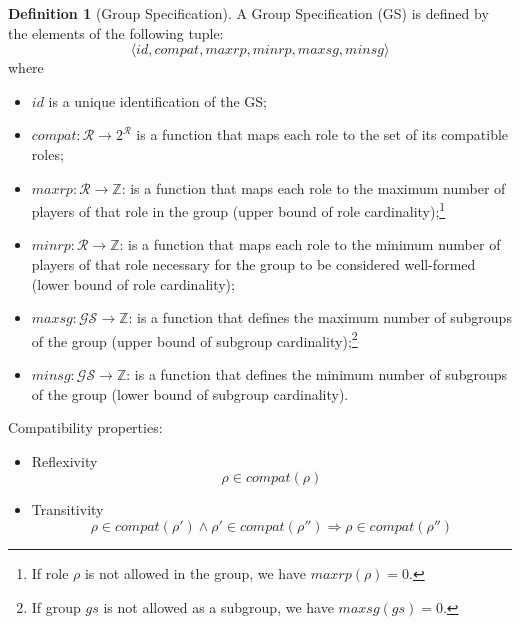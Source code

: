 \documentclass{article}
\newcommand{\set}[1]{\mathcal{#1}}
\theoremstyle{definition} \newtheorem{definition}{Definition}
\begin{document}
\begin{definition}[Group Specification]
  A Group Specification (GS) is defined by the elements of the following tuple:
  \begin{displaymath}
    \langle id, compat, maxrp, minrp, maxsg, minsg \rangle
  \end{displaymath}
  where
  \begin{itemize}
  \item $id$ is a unique identification of the GS;
 \item $compat : \set{R} \to 2^{\mathcal{R}}$ is a
    function that maps each role to the set of its compatible roles;
  \item $maxrp : \mathcal{R} \to \mathbb{Z}$: is a function that maps
    each role to the maximum number of players of that role in the
    group (upper bound of role cardinality);\footnote{If role $\rho$
      is not allowed in the group, we have $maxrp(\rho) = 0$.}
  \item $minrp : \mathcal{R} \to \mathbb{Z}$: is a function
    that maps each role to the minimum number of players of that role
    necessary for the group to be considered well-formed (lower bound
    of role cardinality);
  \item $maxsg : \mathcal{GS} \to \mathbb{Z}$: is a function that
    defines the maximum number of subgroups of the group (upper bound of
    subgroup cardinality);\footnote{If group $gs$ is not allowed as
      a subgroup, we have $maxsg(gs) = 0$.}
  \item $minsg : \mathcal{GS} \to \mathbb{Z}$: is a function that
    defines the minimum number of subgroups of the group (lower bound of
    subgroup cardinality).
 \end{itemize}

Compatibility properties:
\begin{itemize}
\item Reflexivity
  \begin{equation}
    \rho \in compat(\rho)
  \end{equation}

\item Transitivity
  \begin{equation}
    \rho \in compat(\rho') \land \rho' \in compat(\rho'') \Rightarrow \rho \in compat(\rho'')
  \end{equation}


\end{itemize}
\end{definition}
\end{document}
